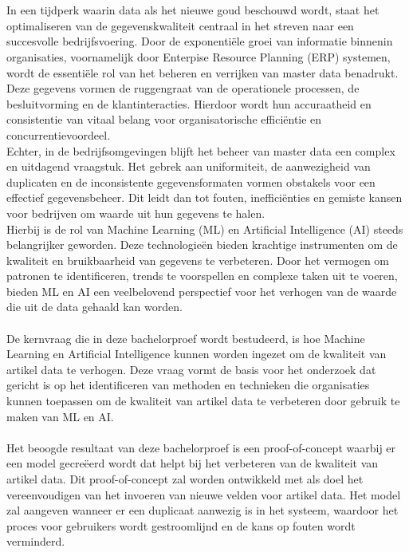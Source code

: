 
\chapter{}%
\label{ch:inleiding}

In een tijdperk waarin data als het nieuwe goud beschouwd wordt, staat het optimaliseren van de gegevenskwaliteit centraal in het streven naar een succesvolle bedrijfsvoering. Door de exponentiële groei van informatie binnenin organisaties, voornamelijk door Enterpise Resource Planning (ERP) systemen, wordt de essentiële rol van het beheren en verrijken van master data benadrukt. Deze gegevens vormen de ruggengraat van de operationele processen, de besluitvorming en de klantinteracties. Hierdoor wordt hun accuraatheid en consistentie van vitaal belang voor organisatorische efficiëntie en concurrentievoordeel.
\\
Echter, in de bedrijfsomgevingen blijft het beheer van master data een complex en uitdagend vraagstuk. Het gebrek aan uniformiteit, de aanwezigheid van duplicaten en de inconsistente gegevensformaten vormen obstakels voor een effectief gegevensbeheer. Dit leidt dan tot fouten, inefficiënties en gemiste kansen voor bedrijven om waarde uit hun gegevens te halen. 
\\
Hierbij is de rol van Machine Learning (ML) en Artificial Intelligence (AI) steeds belangrijker geworden. Deze technologieën bieden krachtige instrumenten om de kwaliteit en bruikbaarheid van gegevens te verbeteren. Door het vermogen om patronen te identificeren, trends te voorspellen en complexe taken uit te voeren, bieden ML en AI een veelbelovend perspectief voor het verhogen van de waarde die uit de data gehaald kan worden.
\\ \\
De kernvraag die in deze bachelorproef wordt bestudeerd, is hoe Machine Learning en Artificial Intelligence kunnen worden ingezet om de kwaliteit van artikel data te verhogen. Deze vraag vormt de basis voor het onderzoek dat gericht is op het identificeren van methoden en technieken die organisaties kunnen toepassen om de kwaliteit van artikel data te verbeteren door gebruik te maken van ML en AI.
\\ \\
Het beoogde resultaat van deze bachelorproef is een proof-of-concept waarbij er een model gecreëerd wordt dat helpt bij het verbeteren van de kwaliteit van artikel data. Dit proof-of-concept zal worden ontwikkeld met als doel het vereenvoudigen van het invoeren van nieuwe velden voor artikel data. Het model zal aangeven wanneer er een duplicaat aanwezig is in het systeem, waardoor het proces voor gebruikers wordt gestroomlijnd en de kans op fouten wordt verminderd.
